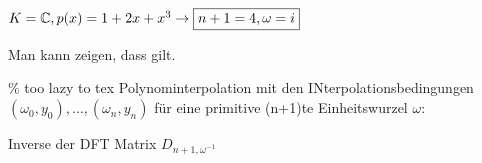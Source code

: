 \documentclass{../tudscript}
\begin{document}

$K = \mathbb{C}, p(x) = 1 + 2x + x^3 \rightarrow \boxed{n+1 = 4, \omega = i}$


Man kann zeigen, dass
gilt.

\% too lazy to tex
Polynominterpolation mit den INterpolationsbedingungen
$(\omega_0, y_0), \ldots, (\omega_n, y_n)$ für eine primitive (n+1)te Einheitswurzel $\omega$:

Inverse der DFT Matrix $D_{n+1, \omega^{-1}}$
\end{document}
